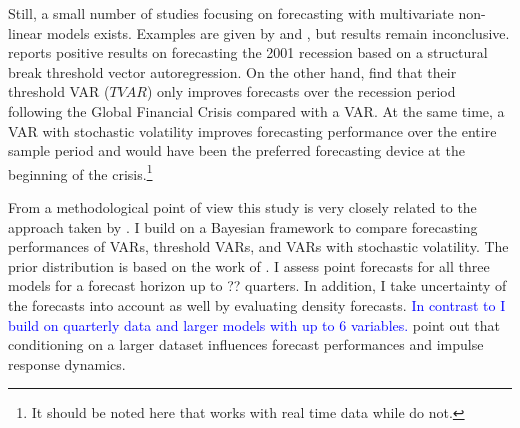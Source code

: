 \documentclass[12pt,letterpaper,fleqn]{article}           %
\begin{document}
Still, a small number of studies focusing on forecasting with multivariate non-linear models exists. Examples are given by \textcite{alessandri17} and \textcite{galvao06}, but results remain inconclusive. \textcite{galvao06} reports positive results on forecasting the 2001 recession based on a structural break threshold vector autoregression. On the other hand, \textcite{alessandri17} find that their threshold VAR ($TVAR$) only improves forecasts over the recession period following the Global Financial Crisis compared with a VAR. At the same time, a VAR with stochastic volatility improves forecasting performance over the entire sample period and would have been the preferred forecasting device at the beginning of the crisis.\footnote{It should be noted here that \textcite{galvao06} works with real time data while \textcite{alessandri17} do not.}


From a methodological point of view this study is very closely related to the approach taken by \textcite{alessandri17}. I build on a Bayesian framework to compare forecasting performances of VARs, threshold VARs, and VARs with stochastic volatility. The prior distribution is based on the work of \textcite{banbura10}. I assess point forecasts for all three models for a forecast horizon up to ?? quarters. In addition, I take uncertainty of the forecasts into account as well by evaluating density forecasts.
\textcolor{blue}{In contrast to \textcite{alessandri17} I build on quarterly data and larger models with up to 6 variables.} \textcite{banbura10} point out that conditioning on a larger dataset influences forecast performances and impulse response dynamics.
\end{document}
